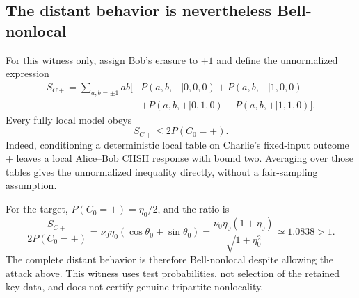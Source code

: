 \documentclass[aps,10pt,onecolumn,prx,superscriptaddress,longbibliography,nofootinbib]{revtex4-2}
\begin{document}
\subsection{The distant behavior is nevertheless Bell-nonlocal}\label{app:remote-bell-witness}

For this witness only, assign Bob's erasure to \(+1\) and define the unnormalized expression
\begin{align}
 S_{C+}=\sum_{a,b=\pm1}ab\bigl[&P(a,b,+|0,0,0)+P(a,b,+|1,0,0)\nonumber\\
 &+P(a,b,+|0,1,0)-P(a,b,+|1,1,0)\bigr].
\end{align}
Every fully local model obeys
\begin{equation}
 S_{C+}\leq2P(C_0=+).
 \label{eq:si-lifted-chsh}
\end{equation}
Indeed, conditioning a deterministic local table on Charlie's fixed-input outcome \(+\) leaves a local Alice--Bob CHSH response with bound two. Averaging over those tables gives the unnormalized inequality directly, without a fair-sampling assumption.

For the target, \(P(C_0=+)=\eta_0/2\), and the ratio is
\begin{equation}
 \frac{S_{C+}}{2P(C_0=+)}
 =\nu_0\eta_0(\cos\theta_0+\sin\theta_0)
 =\frac{\nu_0\eta_0(1+\eta_0)}{\sqrt{1+\eta_0^2}}
 \simeq1.0838>1.
\end{equation}
The complete distant behavior is therefore Bell-nonlocal despite allowing the attack above. This witness uses test probabilities, not selection of the retained key data, and does not certify genuine tripartite nonlocality.



\end{document}
